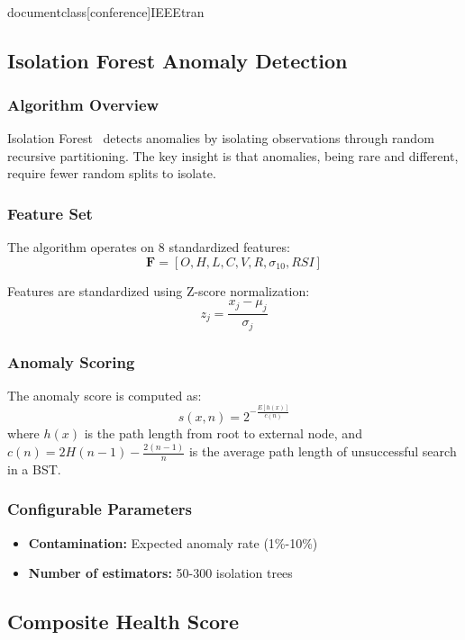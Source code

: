 \\documentclass[conference]{IEEEtran}
\begin{document}
\subsection{Isolation Forest Anomaly Detection}

\subsubsection{Algorithm Overview}
Isolation Forest~\cite{liu2008} detects anomalies by isolating observations through random recursive partitioning. The key insight is that anomalies, being rare and different, require fewer random splits to isolate.

\subsubsection{Feature Set}
The algorithm operates on 8 standardized features:
\begin{equation}
    \mathbf{F} = [O, H, L, C, V, R, \sigma_{10}, RSI]
\end{equation}

Features are standardized using Z-score normalization:
\begin{equation}
    z_j = \frac{x_j - \mu_j}{\sigma_j}
\end{equation}

\subsubsection{Anomaly Scoring}
The anomaly score is computed as:
\begin{equation}
    s(x, n) = 2^{-\frac{E[h(x)]}{c(n)}}
\end{equation}
where $h(x)$ is the path length from root to external node, and $c(n) = 2H(n-1) - \frac{2(n-1)}{n}$ is the average path length of unsuccessful search in a BST.

\subsubsection{Configurable Parameters}
\begin{itemize}
    \item \textbf{Contamination:} Expected anomaly rate (1\%-10\%)
    \item \textbf{Number of estimators:} 50-300 isolation trees
\end{itemize}

\subsection{Composite Health Score}
\end{document}
